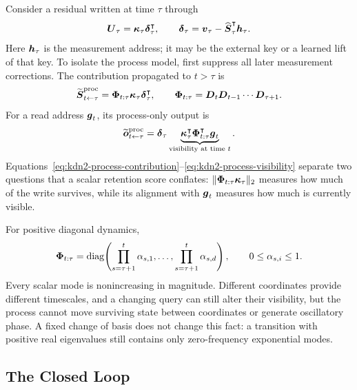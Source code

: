 \documentclass[11pt,letterpaper,logo]{yalearxiv}
\begin{document}
Consider a residual written at time $\tau$ through
\begin{equation}
  \boldsymbol{U}_\tau
  =
  \boldsymbol{\kappa}_\tau\boldsymbol{\delta}_\tau^{\intercal},
  \qquad
  \boldsymbol{\delta}_\tau
  =
  \boldsymbol{v}_\tau-\widehat{\boldsymbol{S}}_\tau^{\intercal}\boldsymbol{h}_\tau.
  \label{eq:kdn2-write-impulse}
\end{equation}
Here $\boldsymbol{h}_\tau$ is the measurement address; it may be the external key or a learned lift of
that key. To isolate the process model, first suppress all later measurement corrections. The
contribution propagated to $t>\tau$ is
\begin{equation}
  \widetilde{\boldsymbol{S}}_{t\leftarrow\tau}^{\mathrm{proc}}
  =
  \boldsymbol{\Phi}_{t:\tau}\boldsymbol{\kappa}_\tau\boldsymbol{\delta}_\tau^{\intercal},
  \qquad
  \boldsymbol{\Phi}_{t:\tau}
  =
  \boldsymbol{D}_t\boldsymbol{D}_{t-1}\cdots\boldsymbol{D}_{\tau+1}.
  \label{eq:kdn2-process-contribution}
\end{equation}
For a read address $\boldsymbol{g}_t$, its process-only output is
\begin{equation}
  \widetilde{\boldsymbol{o}}_{t\leftarrow\tau}^{\mathrm{proc}}
  =
  \boldsymbol{\delta}_\tau
  \underbrace{
    \boldsymbol{\kappa}_\tau^{\intercal}
    \boldsymbol{\Phi}_{t:\tau}^{\intercal}\boldsymbol{g}_t
  }_{\text{visibility at time }t}.
  \label{eq:kdn2-process-visibility}
\end{equation}
Equations~\eqref{eq:kdn2-process-contribution}--\eqref{eq:kdn2-process-visibility} separate two
questions that a scalar retention score conflates:
$\|\boldsymbol{\Phi}_{t:\tau}\boldsymbol{\kappa}_\tau\|_2$ measures how much of the write survives, while its
alignment with $\boldsymbol{g}_t$ measures how much is currently visible.

For positive diagonal dynamics,
\begin{equation}
  \boldsymbol{\Phi}_{t:\tau}
  =
  \operatorname{diag}\!\left(
    \prod_{s=\tau+1}^{t}\alpha_{s,1},
    \ldots,
    \prod_{s=\tau+1}^{t}\alpha_{s,d}
  \right),
  \qquad
  0\leq\alpha_{s,i}\leq1.
  \label{eq:kdn2-diagonal-product}
\end{equation}
Every scalar mode is nonincreasing in magnitude. Different coordinates provide different
timescales, and a changing query can still alter their visibility, but the process cannot move
surviving state between coordinates or generate oscillatory phase. A fixed change of basis does
not change this fact: a transition with positive real eigenvalues still contains only
zero-frequency exponential modes.

\subsection{The Closed Loop}
\label{sec:kdn2-closed-loop}
\end{document}
